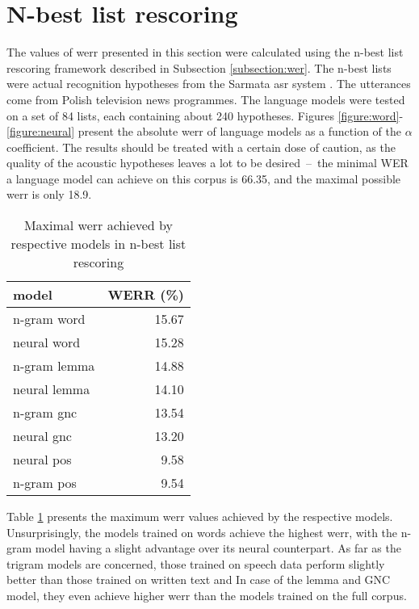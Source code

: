 \section{N-best list rescoring}
\label{section:nbest}
The values of \gls{werr} presented in this section were calculated using the n-best list rescoring framework described in Subsection \ref{subsection:wer}. The n-best lists were actual recognition hypotheses from the Sarmata \gls{asr} system \cite{ziolko2011automatic}. The utterances come from Polish television news programmes. The language models were tested on a set of 84 lists, each containing about 240 hypotheses. Figures \ref{figure:word}-\ref{figure:neural} present the absolute \gls{werr} of language models as a function of the $\alpha$ coefficient. The results should be treated with a certain dose of caution, as the quality of the acoustic hypotheses leaves a lot to be desired~--~the minimal WER a language model can achieve on this corpus is 66.35, and the maximal possible \gls{werr} is only 18.9.  

\begin{table}[!htbp]
	\centering
	\caption{Maximal \gls{werr} achieved by respective models in n-best list rescoring}
	\label{table:max_werr}
	\begin{tabular*}{.4\linewidth}{@{\extracolsep{\fill}}lr}
		model  & WERR (\%)\\
		\midrule
		n-gram word   & 15.67\\
		neural word   & 15.28\\
		n-gram lemma  & 14.88\\
		neural lemma  & 14.10\\
		n-gram gnc    & 13.54\\
		neural gnc    & 13.20\\
		neural pos    & 9.58\\
		n-gram pos    & 9.54\\
	\end{tabular*}
\end{table}

 Table \ref{table:max_werr} presents the maximum \gls{werr} values achieved by the respective models. Unsurprisingly, the models trained on words achieve the highest \gls{werr}, with the n-gram model having a slight advantage over its neural counterpart. As far as the trigram models are concerned, those trained on speech data perform slightly better than those trained on written text and In case of the lemma and GNC model, they even achieve higher \gls{werr} than the models trained on the full corpus.

